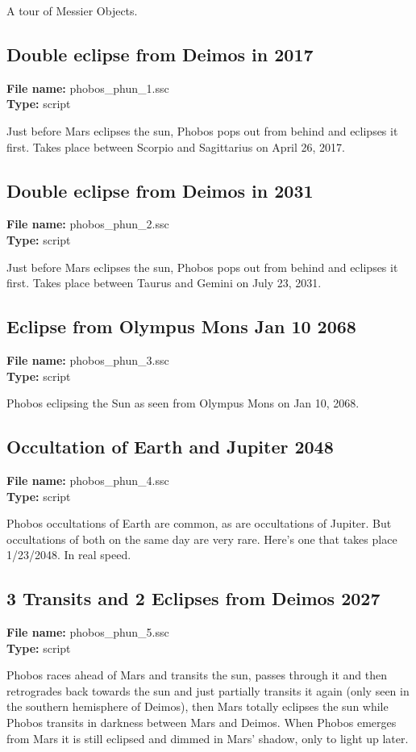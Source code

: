 A tour of Messier Objects.

\subsection{Double eclipse from Deimos in 2017}
\textbf{File name:} phobos\_phun\_1.ssc \\
\textbf{Type:} script

Just before Mars eclipses the sun, Phobos pops out from behind and eclipses it first. Takes place between Scorpio and Sagittarius on April 26, 2017.

\subsection{Double eclipse from Deimos in 2031}
\textbf{File name:} phobos\_phun\_2.ssc \\
\textbf{Type:} script

Just before Mars eclipses the sun, Phobos pops out from behind and eclipses it first. Takes place between Taurus and Gemini on July 23, 2031.

\subsection{Eclipse from Olympus Mons Jan 10 2068}
\textbf{File name:} phobos\_phun\_3.ssc \\
\textbf{Type:} script

Phobos eclipsing the Sun as seen from Olympus Mons on Jan 10, 2068.

\subsection{Occultation of Earth and Jupiter 2048}
\textbf{File name:} phobos\_phun\_4.ssc \\
\textbf{Type:} script

Phobos occultations of Earth are common, as are occultations of Jupiter. But occultations of both on the same day are very rare. Here's one that takes place 1/23/2048. In real speed.

\subsection{3 Transits and 2 Eclipses from Deimos 2027}
\textbf{File name:} phobos\_phun\_5.ssc \\
\textbf{Type:} script

Phobos races ahead of Mars and transits the sun, passes through it and then retrogrades back towards the sun and just partially transits it again (only seen in the southern hemisphere of Deimos), then Mars totally eclipses the sun while Phobos transits in darkness between Mars and Deimos. When Phobos emerges from Mars it is still eclipsed and dimmed in Mars' shadow, only to light up later.

